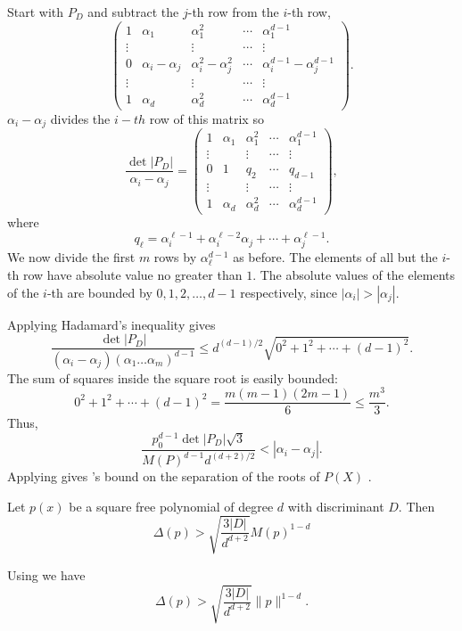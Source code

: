 Start with $P_D$ and subtract the $j$-th row from the $i$-th row,
\[
\left(\begin{array}{ccccccc}
1 & \alpha_1 & \alpha_1^2 & \cdots & \alpha_1^{d-1} \\
\vdots & & \vdots & \cdots & \vdots \\
0 & \alpha_i - \alpha_j & \alpha_i^2 - \alpha_j^2 & \cdots &
\alpha_i^{d-1} - \alpha_j^{d-1} \\
\vdots & & \vdots & \cdots & \vdots \\
1 & \alpha_d & \alpha_d^2 & \cdots & \alpha_d^{d-1} 
\end{array}\right).
\]
$\alpha_i - \alpha_j$ divides the $i-th$ row of this matrix so
\[
\frac{\det|P_D|}{\alpha_i - \alpha_j} = 
\left(\begin{array}{ccccccc}
1 & \alpha_1 & \alpha_1^2 & \cdots & \alpha_1^{d-1} \\
\vdots & & \vdots & \cdots & \vdots \\
0 & 1 & q_2 & \cdots & q_{d-1} \\
\vdots & & \vdots & \cdots & \vdots \\
1 & \alpha_d & \alpha_d^2 & \cdots & \alpha_d^{d-1} 
\end{array}\right),
\]
where 
\[
q_{\ell} = \alpha_i^{\ell-1} + \alpha_i^{\ell -2} \alpha_j + \cdots +
\alpha_j^{\ell-1}.
\]
We now divide the first $m$ rows by $\alpha_{\ell}^{d-1}$ as before.
The elements of all but the $i$-th row have absolute value no
greater than $1$.  The absolute values of the elements of the $i$-th
are bounded by $0, 1, 2, \ldots, {d-1}$ respectively, since
$|\alpha_i| > |\alpha_j|$.  

Applying Hadamard's inequality gives
\[
\frac{\det|P_D|}{(\alpha_i - \alpha_j) (\alpha_1 \ldots
\alpha_m)^{d-1}} 
\le d^{(d-1)/2}\sqrt{0^2 + 1^2 + \cdots + (d-1)^2}.
\]
The sum of squares inside the square root is easily bounded:
\[
0^2 + 1^2 + \cdots + (d-1)^2 = \frac{m(m-1)(2m-1)}{6} \le
\frac{m^3}{3}.
\]
Thus,
\[
\frac{p_0^{d-1} \det|P_D| \sqrt{3}}{M(P)^{d-1} d^{(d+2)/2}} 
   < |\alpha_i - \alpha_j|.
\]
Applying  gives {\Mahler}'s bound on the separation of the roots of $P(X)$ \cite{Mahler64}.

\begin{proposition}[{\Mahler}]
Let $p(x)$ be a square free polynomial of degree $d$ with discriminant $D$.
Then
\[
\Delta(p) > \sqrt{\frac{3 |D|}{d^{d+2}}} M(p)^{1-d}
\]
\end{proposition}

Using  we have
\[
\Delta(p) > \sqrt{\frac{3 |D|}{d^{d+2}}} \|p\|^{1-d}.
\]

